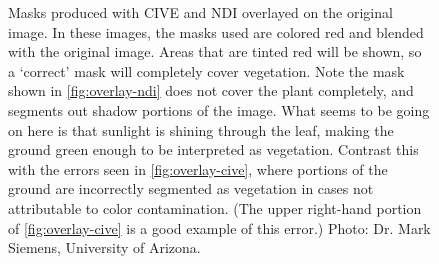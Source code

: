 \documentclass[agriculture,article,submit,pdftex,moreauthors]{Definitions/mdpi}
\begin{document}
\begin{figure}[H]
	\centering
	\hfill
	\caption[Masks overlayed on original images]{Masks produced with CIVE and NDI overlayed on the original image. In these images, the masks used are colored red and blended with the original image. Areas that are tinted red will be shown, so a `correct' mask will completely cover vegetation. Note the mask shown in \ref{fig:overlay-ndi} does not cover the plant completely, and segments out shadow portions of the image. What seems to be going on here is that sunlight is shining through the leaf, making the ground green enough to be interpreted as vegetation. Contrast this with the errors seen in \ref{fig:overlay-cive}, where portions of the ground are incorrectly segmented as vegetation in cases not attributable to color contamination. (The upper right-hand portion of \ref{fig:overlay-cive} is a good example of this error.) Photo: Dr. Mark Siemens, University of Arizona.}
	\label{fig:overlay}
\end{figure}
\end{document}
